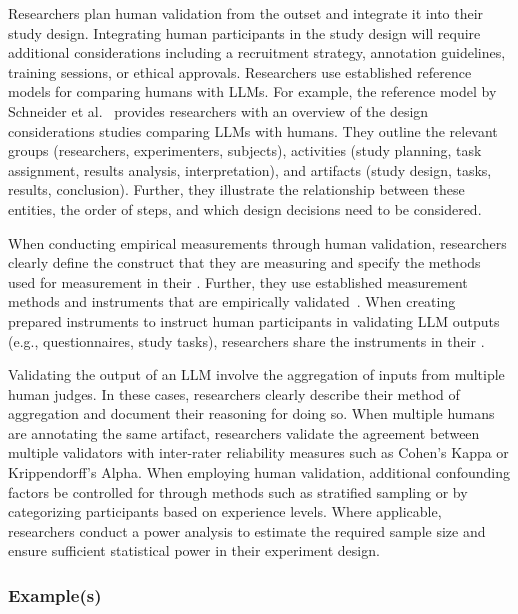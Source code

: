 Researchers \should plan human validation from the outset and integrate it into their study design.
Integrating human participants in the study design will require additional considerations including a recruitment strategy, annotation guidelines, training sessions, or ethical approvals.
Researchers \should use established reference models for comparing humans with LLMs.
For example, the reference model by Schneider et al.~\cite{Schneider2025ReferenceModel} provides researchers with an overview of the design considerations studies comparing LLMs with humans.
They outline the relevant groups (researchers, experimenters, subjects), activities (study planning, task assignment, results analysis, interpretation), and artifacts (study design, tasks, results, conclusion).
Further, they illustrate the relationship between these entities, the order of steps, and which design decisions need to be considered.

When conducting empirical measurements through human validation, researchers \must clearly define the construct that they are measuring and \must specify the methods used for measurement in their \paper.
Further, they \should use established measurement methods and instruments that are empirically validated~\cite{DBLP:journals/fcomp/HoffmanMKL23, DBLP:conf/chi/PerrigSB23}.
When creating prepared instruments to instruct human participants in validating LLM outputs (e.g., questionnaires, study tasks), researchers \should share the instruments in their \supplementarymaterial.

Validating the output of an LLM \may involve the aggregation of inputs from multiple human judges.
In these cases, researchers \should clearly describe their method of aggregation and document their reasoning for doing so.
When multiple humans are annotating the same artifact, researchers \should validate the agreement between multiple validators with inter-rater reliability measures such as Cohen's Kappa or Krippendorff's Alpha.
When employing human validation, additional confounding factors \should be controlled for through methods such as stratified sampling or by categorizing participants based on experience levels.
Where applicable, researchers \should conduct a power analysis to estimate the required sample size and ensure sufficient statistical power in their experiment design.


\subsubsection{Example(s)}

